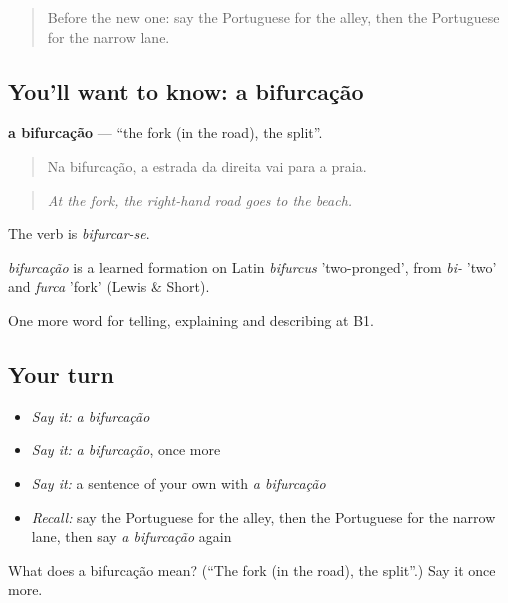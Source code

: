 \label{lesson:PT-C437-bifurcacao}



\begin{quote}
Before the new one: say the Portuguese for the alley, then the Portuguese for the narrow lane.
\end{quote}

\subsection*{You'll want to know: a bifurcação}
\textbf{a bifurcação} — \textquotedblleft{}the fork (in the road), the split\textquotedblright{}.

\begin{quote}
Na bifurcação, a estrada da direita vai para a praia.
\end{quote}

\begin{quote}
\emph{At the fork, the right-hand road goes to the beach.}
\end{quote}

The verb is \emph{bifurcar-se}.

\begin{cousinweb}
\emph{bifurcação} is a learned formation on Latin \emph{bifurcus} 'two-pronged', from \emph{bi-} 'two' and \emph{furca} 'fork' (Lewis \& Short).
\end{cousinweb}

\begin{grammarlens}[title={What you've built}]
One more word for telling, explaining and describing at B1.
\end{grammarlens}

\subsection*{Your turn}
\begin{itemize}
\raggedright
  \item \emph{Say it:} \emph{a bifurcação}
  \item \emph{Say it:} \emph{a bifurcação}, once more
  \item \emph{Say it:} a sentence of your own with \emph{a bifurcação}
  \item \emph{Recall:} say the Portuguese for the alley, then the Portuguese for the narrow lane, then say \emph{a bifurcação} again
\end{itemize}

\begin{tcolorbox}[breakable,colback=teal!4,colframe=teal!35!black,title={Before you move on}]
What does a bifurcação mean? (\textquotedblleft{}The fork (in the road), the split\textquotedblright{}.) Say it once more.
\end{tcolorbox}
